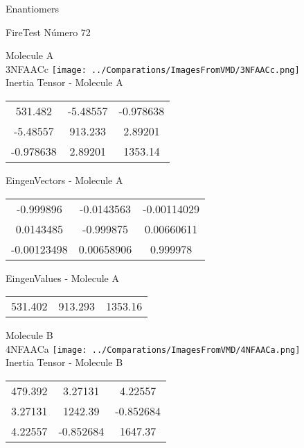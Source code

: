 \begin{center}
\vtab
\vtab
\textcolor{NavyBlue}{\Large Enantiomers}
\end{center}

 \newpage

\vtab[-2cm]
\begin{center}
{\large FireTest \tab Número 72}
\end{center}
\begin{multicols}{2}
\begin{center}

Molecule A \\ 
3NFAACc
\texttt{[image: ../Comparations/ImagesFromVMD/3NFAACc.png]}
\\
Inertia Tensor - Molecule A \\
\vtab

\begin{tabular}{|c c c|}
531.482	 & 	-5.48557	 & 	-0.978638	 \\
-5.48557	 & 	913.233	 & 	2.89201	 \\
-0.978638	 & 	2.89201	 & 	1353.14
\end{tabular}

\vtab
 EingenVectors - Molecule A     \\
\vtab
\begin{tabular}{|c c c|}
-0.999896	 & 	-0.0143563	 & 	-0.00114029	 \\
0.0143485	 & 	-0.999875	 & 	0.00660611	 \\
-0.00123498	 & 	0.00658906	 & 	0.999978
\end{tabular}

\vtab
 EingenValues - Molecule A     \\
\vtab
\begin{tabular}{|c c c|}
531.402	 & 	913.293	 & 	1353.16	 \\
\end{tabular}
\columnbreak

Molecule B \\ 
4NFAACa
\texttt{[image: ../Comparations/ImagesFromVMD/4NFAACa.png]}
\\
Inertia Tensor - Molecule B \\
\vtab

\begin{tabular}{|c c c|}
479.392	 & 	3.27131	 & 	4.22557	 \\
3.27131	 & 	1242.39	 & 	-0.852684	 \\
4.22557	 & 	-0.852684	 & 	1647.37
\end{tabular}


\end{center}
\end{multicols}
